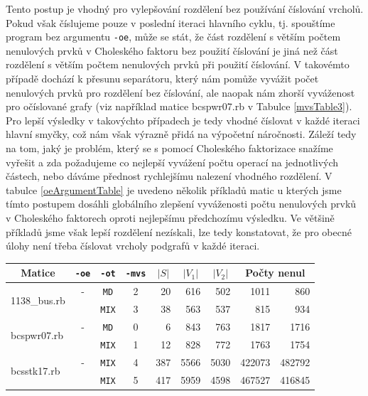 \documentclass{ctuthesis}
\newcommand{\cmark}{\ding{51}}%
\theoremstyle{plain}
\theoremstyle{definition}
\begin{document}
\label{mvswithNumbering}
Tento postup je vhodný pro vylepšování rozdělení bez používání číslování vrcholů. Pokud však číslujeme pouze v poslední iteraci hlavního cyklu, tj. spouštíme program bez argumentu \texttt{-oe}, může se stát, že část rozdělení s větším počtem nenulových prvků v Choleského faktoru bez použití číslování je jiná než část rozdělení s větším počtem nenulových prvků při použití číslování. V takovémto případě dochází k přesunu separátoru, který nám pomůže vyvážit počet nenulových prvků pro rozdělení bez číslování, ale naopak nám zhorší vyváženost pro očíslované grafy (viz například matice bcspwr07.rb v Tabulce \ref{mvsTable3}). Pro lepší výsledky v takovýchto případech je tedy vhodné číslovat v každé iteraci hlavní smyčky, což nám však výrazně přidá na výpočetní náročnosti. Záleží tedy na tom, jaký je problém, který se s pomocí Choleského faktorizace snažíme vyřešit a zda požadujeme co nejlepší vyvážení počtu operací na jednotlivých částech, nebo dáváme přednost rychlejšímu nalezení vhodného rozdělení. V tabulce \ref{oeArgumentTable} je uvedeno několik příkladů matic u kterých jsme tímto postupem dosáhli globálního zlepšení vyváženosti počtu nenulových prvků v Choleského faktorech oproti nejlepšímu předchozímu výsledku. Ve většině příkladů jsme však lepší rozdělení nezískali, lze tedy konstatovat, že pro obecné úlohy není třeba číslovat vrcholy podgrafů v každé iteraci.

\bigskip
{\noindent
\footnotesize
  \centering
  \renewcommand{\arraystretch}{1.15}
\begin{tabular}{|l|c|c|c|r|r|r|r|r|}
  \hline
  \multicolumn{1}{|c|}{Matice} & \multicolumn{1}{|c|}{\texttt{-oe}} & \multicolumn{1}{|c|}{\texttt{-ot}}  &\multicolumn{1}{|c|}{\texttt{-mvs}} &\multicolumn{1}{|c|}{$|S|$} & \multicolumn{1}{|c|}{$|V_1|$}& \multicolumn{1}{|c|}{$|V_2|$} & \multicolumn{2}{c|}{Počty nenul} \\
  \hline
  \multirow{2}{*}{1138\_bus.rb} 
  & -  &  \texttt{MD}   & 2  &	20	&	616	&	502	&	1011 &	860	\\
  & \cmark &  \texttt{MIX}  & 3  &	38	&	563	&	537	&	815	 &	934	\\
  \hline
  \multirow{2}{*}{bcspwr07.rb} 
  & -  &  \texttt{MD}   & 0 &	6	 &	843	&	763	&	1817	&	1716	\\
  & \cmark &  \texttt{MIX}  & 1 &	12	&	828	&	772	&	1763	&	1754	\\
  \hline
  \multirow{2}{*}{bcsstk17.rb} 
  & -  &  \texttt{MIX}  & 4 &	387	&	5566	&	5030	&	422073	&	482792	\\
  & \cmark &  \texttt{MIX}  & 5 &	417	&	5959	&	4598	&	467527	&	416845	\\
  \hline

\end{tabular}
}
\end{document}
